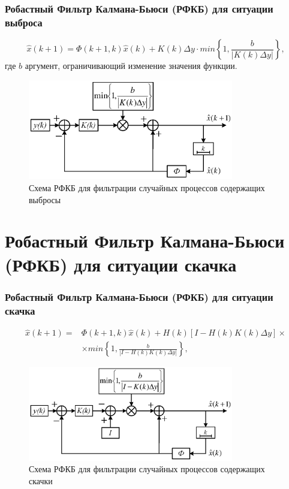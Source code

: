 \documentclass[10pt,pdf,hyperref={unicode}]{beamer}
\begin{document}
\begin{frame}
\frametitle{Робастный Фильтр Калмана-Бьюси (РФКБ) для ситуации выброса}

\begin{equation}\label{eq3:skachok}
\hat{x}(k+1)=\Phi(k+1,k)\hat{x}(k)+K(k)\Delta y\cdot min\left\{1,\frac{b}{|K(k)\Delta y|}\right\},
\end{equation}
где $b$ аргумент, ограничивающий изменение значения функции.
\begin{figure} [h]
  \center
\includegraphics[width=0.8\textwidth]{3chapter/output.eps}
  \caption*{Схема РФКБ для фильтрации случайных процессов содержащих выбросы}
  \label{img3:kalmanV}
\end{figure}

\end{frame}


\section{Робастный Фильтр Калмана-Бьюси (РФКБ) для ситуации скачка}

\begin{frame}
\frametitle{{\large Робастный Фильтр Калмана-Бьюси (РФКБ) для ситуации скачка}}

\begin{equation}\label{eq3:vibros}
\begin{split}
\hat{x}(k+1)=&\Phi(k+1,k)\hat{x}(k)+H(k)[I-H(k)K(k)\Delta y]\times \\
&\times min\left\{1,\frac{b}{|I-H(k)K(k)\Delta y|}\right\},
\end{split}
\end{equation}
\begin{figure} [h]
  \center
\includegraphics[width=0.8\textwidth]{3chapter/output1.eps}
  \caption*{Схема РФКБ для фильтрации случайных процессов содержащих скачки}
  \label{img3:kalmanS}
\end{figure}
\end{frame}
\end{document}
